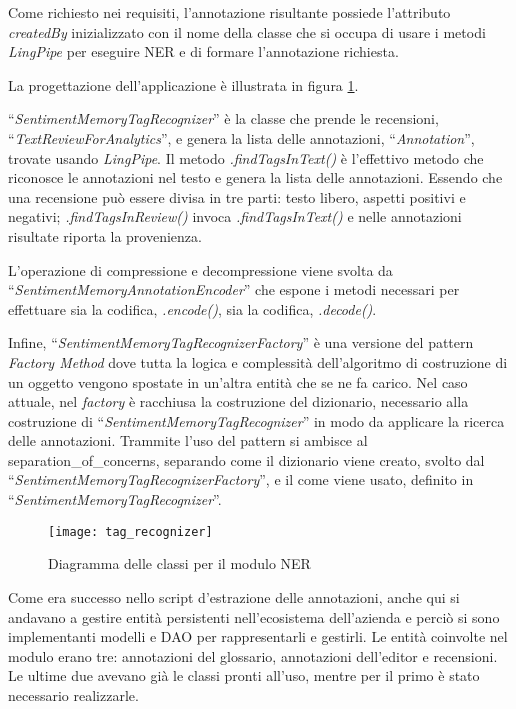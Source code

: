 Come richiesto nei requisiti, l'annotazione risultante possiede l'attributo
\textit{createdBy} inizializzato con il nome della classe che si occupa di
usare i metodi \textit{LingPipe} per eseguire \gls{NER} e di formare
l'annotazione richiesta.

La progettazione dell'applicazione è illustrata in figura
\ref{fig:tag_recognizer}.

``\textit{SentimentMemoryTagRecognizer}'' è la classe che prende le recensioni,
``\textit{TextReviewForAnalytics}'', e genera la lista delle annotazioni,
``\textit{Annotation}'', trovate usando \textit{LingPipe}. Il metodo
\textit{.findTagsInText()} è l'effettivo metodo che riconosce le annotazioni nel
testo e genera la lista delle annotazioni. Essendo che una recensione può essere
divisa in tre parti: testo libero, aspetti positivi e negativi;
\textit{.findTagsInReview()} invoca \textit{.findTagsInText()} e nelle
annotazioni risultate riporta la provenienza.

L'operazione di compressione e decompressione viene svolta da
``\textit{SentimentMemoryAnnotationEncoder}'' che espone i metodi necessari per
effettuare sia la codifica, \textit{.encode()}, sia la codifica,
\textit{.decode()}.

Infine, ``\textit{SentimentMemoryTagRecognizerFactory}'' è una versione del
pattern \textit{Factory Method} dove tutta la logica e complessità
dell'algoritmo di costruzione di un oggetto vengono spostate in un'altra entità
che se ne fa carico. Nel caso attuale, nel \textit{factory} è racchiusa la
costruzione del dizionario, necessario alla costruzione di
``\textit{SentimentMemoryTagRecognizer}'' in modo da applicare la ricerca delle
annotazioni. Trammite l'uso del pattern si ambisce al
\gls{separation_of_concerns}, separando come il dizionario viene creato, svolto
dal ``\textit{SentimentMemoryTagRecognizerFactory}'', e il come viene usato,
definito in ``\textit{SentimentMemoryTagRecognizer}''.

\begin{figure}[H]
\begin{center}
\texttt{[image: tag\_recognizer]}
\caption{
Diagramma delle classi per il modulo NER
}
\label{fig:tag_recognizer}
\end{center}
\end{figure}

Come era successo nello \gls{script} d'estrazione delle annotazioni, anche qui
si andavano a gestire entità persistenti nell'ecosistema dell'azienda e perciò
si sono implementanti modelli e \gls{DAO} per rappresentarli e gestirli. Le
entità coinvolte nel modulo erano tre: annotazioni del glossario, annotazioni
dell'editor e recensioni. Le ultime due avevano già le classi pronti all'uso,
mentre per il primo è stato necessario realizzarle.

